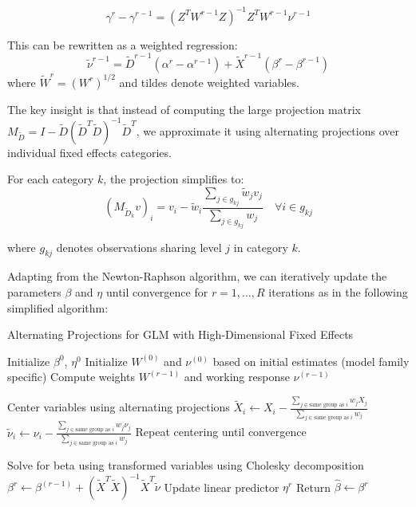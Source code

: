 \documentclass[
  10pt,
  letterpaper,
]{article}
\begin{document}
\[\gamma^r - \gamma^{r-1} = (Z^{T}W^{r-1}Z)^{-1}Z^{T}W^{r-1}\nu^{r-1}\]

This can be rewritten as a weighted regression:
\[\tilde{\nu}^{r-1} = \tilde{D}^{r-1}(\alpha^r - \alpha^{r-1}) + \tilde{X}^{r-1}(\beta^r - \beta^{r-1})\]
where \(\tilde{W}^r = (W^r)^{1/2}\) and tildes denote weighted
variables.

The key insight is that instead of computing the large projection matrix
\(M_{\tilde{D}} = I - \tilde{D}(\tilde{D}^{T}\tilde{D})^{-1}\tilde{D}^{T}\),
we approximate it using alternating projections over individual fixed
effects categories.

For each category \(k\), the projection simplifies to:
\[(M_{\tilde{D}_k}v)_i = v_i - \tilde{w}_i \frac{\sum_{j \in g_{kj}} \tilde{w}_j v_j}{\sum_{j \in g_{kj}} w_j} \quad \forall i \in g_{kj}\]

where \(g_{kj}\) denotes observations sharing level \(j\) in category
\(k\).

Adapting from the Newton-Raphson algorithm, we can iteratively update
the parameters \(\beta\) and \(\eta\) until convergence for
\(r = 1, \ldots, R\) iterations as in the following simplified
algorithm:

\begin{algorithm}
\caption{Alternating Projections for GLM with High-Dimensional Fixed Effects}
\begin{algorithmic}[1]
\State Initialize $\beta^0$, $\eta^0$
\State Initialize $W^{(0)}$ and $\nu^{(0)}$ based on initial estimates (model family specific)
\Repeat
  \State Compute weights $W^{(r-1)}$ and working response $\nu^{(r-1)}$
  
  \State Center variables using alternating projections
      \State $\tilde{X}_i \gets X_i - \frac{\sum_{j \in \text{same group as }i} w_j X_j}{\sum_{j \in \text{same group as }i} w_j}$
      \State $\tilde{\nu}_i \gets \nu_i - \frac{\sum_{j \in \text{same group as }i} w_j \nu_j}{\sum_{j \in \text{same group as }i} w_j}$
    \EndFor
  \EndFor
  \State Repeat centering until convergence
  
  \State Solve for beta using transformed variables using Cholesky decomposition
  \State $\beta^r \gets \beta^{(r-1)} + (\tilde{X}^{T}\tilde{X})^{-1}\tilde{X}^{T}\tilde{\nu}$
  \State Update linear predictor $\eta^r$
\State Return $\hat{\beta} \gets \beta^r$
\end{algorithmic}
\end{algorithm}
\end{document}
